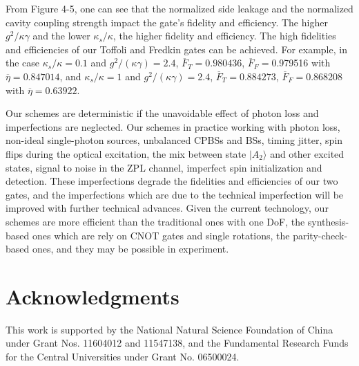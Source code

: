 \documentclass[showpacs,preprintnumbers,showkeys,amsmath,amssymb]{revtex4}%
\begin{document}
 From Figure 4-5, one can see that the normalized side leakage and the normalized cavity coupling strength impact the gate's fidelity and efficiency. The higher $g^2/\kappa\gamma$ and the lower $\kappa_s/\kappa$, the higher fidelity and efficiency. The high fidelities and efficiencies of our Toffoli and Fredkin gates can be achieved. For example, in the case $\kappa_s/\kappa=0.1$ and $g^2/(\kappa\gamma)=2.4$, $\overline{F}_T=0.980436$, $\overline{F}_F=$0.979516 with $\overline{\eta}=0.847014$, and
 $\kappa_s/\kappa=1$ and $g^2/(\kappa\gamma)=2.4$, $\overline{F}_T=0.884273$, $\overline{F}_F=$0.868208 with $\overline{\eta}=0.63922$.


Our schemes are deterministic if the unavoidable effect of photon loss and  imperfections are neglected.  Our schemes in practice working with photon loss, non-ideal single-photon sources, unbalanced CPBSs and BSs, timing jitter, spin flips during the optical excitation,  the mix between state $|A_2\rangle$  and other excited states, signal to noise in the ZPL channel, imperfect spin initialization and detection. These imperfections degrade the fidelities and efficiencies of our two gates, and the imperfections which are due to the technical imperfection will be improved with further technical advances. Given the current technology, our schemes are more efficient than the traditional ones with one DoF,  the synthesis-based ones which are rely on CNOT gates and single rotations, the parity-check-based ones, and they may be possible in experiment.






\section*{Acknowledgments}


This work is supported by the National Natural Science Foundation of
China under Grant Nos. 11604012 and 11547138, and the Fundamental Research Funds for
the Central Universities under Grant No. 06500024.
\end{document}
